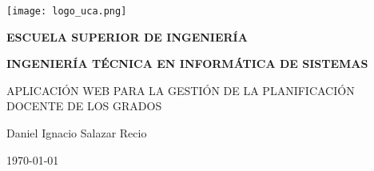 

\begin{titlepage}

  \begin{center}

    \texttt{[image: logo\_uca.png]} \\
    
    \vspace{2.0cm}
    
    \LARGE{\textbf{ESCUELA SUPERIOR DE INGENIERÍA}} \\
    
    \vspace{1.0cm}
    
    \Large{\textbf{INGENIERÍA TÉCNICA EN INFORMÁTICA DE SISTEMAS}} \\
    
    \vspace{3.0cm}
    
    \Large{APLICACIÓN WEB PARA LA GESTIÓN DE LA PLANIFICACIÓN DOCENTE DE LOS GRADOS} \\
    
    \vspace{2.0cm}
    
    \Large{Daniel Ignacio Salazar Recio} \\
  
    \vspace{0.5cm}

    \large{\today}
    
  \end{center}
\end{titlepage}

